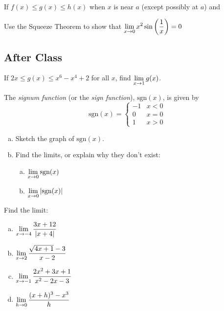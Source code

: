 \documentclass[notes]{subfiles}
\begin{document}
		
		\begin{thm}
			If $f(x)\leq g(x)\leq h(x)$ when $x$ is near $a$ (except possibly at $a$) and
		\end{thm}
		
		\begin{ex}
			Use the Squeeze Theorem to show that $\displaystyle \lim_{x\to 0} x^2 \sin \left( \dfrac{1}{x}\right)= 0$
		\end{ex}
			\newpage
			
	\subsection*{After Class}
		\begin{ex}
			If $2x\leq g(x) \leq x^6 - x^4 + 2$ for all $x$, find $\displaystyle \lim_{x\to 1} g(x)$.
		\end{ex}
			
		\begin{ex}
			The \emph{signum function} (or the \emph{sign function}), $\text{sgn}(x)$, is given by \[\text{sgn}(x) = \begin{cases}-1 & x < 0\\ 0 & x = 0\\ 1 & x > 0 \end{cases}\]  
			\begin{enumerate}[(a)]
				\item Sketch the graph of $\text{sgn}(x)$.
					
				\item Find the limits, or explain why they don't exist:
					\begin{enumerate}[(a)]
						\item $\displaystyle \lim_{x\to 0} \text{sgn}(x)$
						\item $\displaystyle \lim_{x\to 0} |\text{sgn}(x)|$
					\end{enumerate}
			\end{enumerate}
		\end{ex}

		
			\newpage
			
		\begin{ex}
			Find the limit: 
			\begin{enumerate}[(a)]
				\item $\displaystyle \lim_{x\to -4} \dfrac{3x + 12}{|x + 4|}$
					\vs{1}
				\item $\displaystyle \lim_{x\to 2} \dfrac{\sqrt{4x+1} - 3}{x-2}$
					\vs{1}
				\item $\displaystyle \lim_{x\to -1} \dfrac{2x^2 + 3x + 1}{x^2 - 2x -3}$
					\vs{1}
				\item $\displaystyle \lim_{h\to 0} \dfrac{(x+h)^3 - x^3}{h}$
					\vs{1}
			\end{enumerate}
		\end{ex}
	\clearpage
\end{document}
